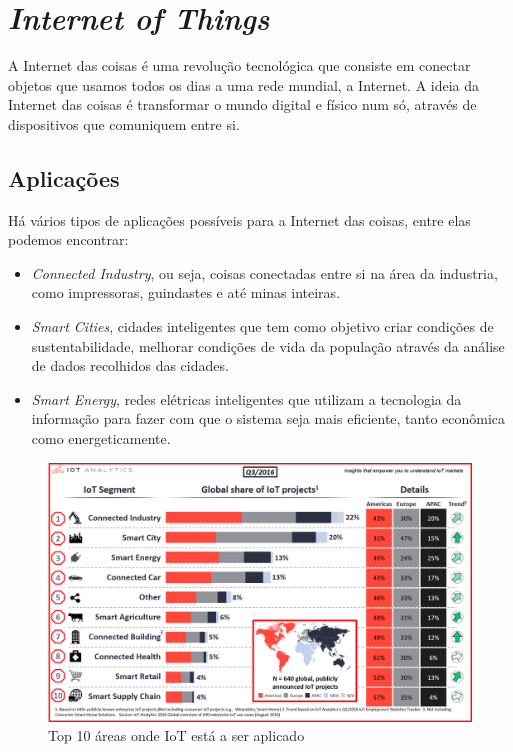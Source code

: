 \documentclass{llncs}
\begin{document}
\newpage


\section{\textit{Internet of Things}}
A Internet das coisas é uma revolução tecnológica que consiste em conectar objetos que usamos todos os dias a uma rede mundial, a Internet. A ideia da Internet das coisas é transformar o mundo digital e físico num só, através de dispositivos que comuniquem entre si. \cite{onl2} \\

\subsection{Aplicações}
Há vários tipos de aplicações possíveis para a Internet das coisas, entre elas podemos encontrar: 
\begin{itemize}
\item \textit{Connected Industry}, ou seja, coisas conectadas entre si na área da industria, como impressoras, guindastes e até minas inteiras. \cite{onl3}
\item \textit{Smart Cities}, cidades inteligentes que tem como objetivo criar condições de sustentabilidade, melhorar condições de vida da população através da análise de dados recolhidos das cidades.\cite{onl4}
\item \textit{Smart Energy}, redes elétricas inteligentes que utilizam a tecnologia da informação para fazer com que o sistema seja mais eficiente, tanto econômica como energeticamente. \cite{onl5}
\end{itemize}


\begin{figure}[!ht]
\centering
\includegraphics[width=120mm]{applications.png}
\caption{Top 10 áreas onde IoT está a ser aplicado \cite{onl3}}
\end{figure}
\end{document}
